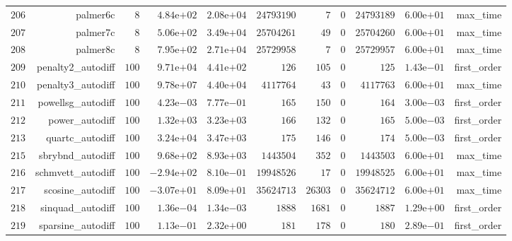 \documentclass[varwidth=20cm,crop=true]{standalone}
\begin{document}
\begin{longtable}{rrrrrrrrrrr}
  \(   206\) & palmer6c & \(     8\) & \( 4.84\)e\(+02\) & \( 2.08\)e\(+04\) & \(24793190\) & \(     7\) & \(     0\) & \(24793189\) & \( 6.00\)e\(+01\) & max\_time \\
  \(   207\) & palmer7c & \(     8\) & \( 5.06\)e\(+02\) & \( 3.49\)e\(+04\) & \(25704261\) & \(    49\) & \(     0\) & \(25704260\) & \( 6.00\)e\(+01\) & max\_time \\
  \(   208\) & palmer8c & \(     8\) & \( 7.95\)e\(+02\) & \( 2.71\)e\(+04\) & \(25729958\) & \(     7\) & \(     0\) & \(25729957\) & \( 6.00\)e\(+01\) & max\_time \\
  \(   209\) & penalty2\_autodiff & \(   100\) & \( 9.71\)e\(+04\) & \( 4.41\)e\(+02\) & \(   126\) & \(   105\) & \(     0\) & \(   125\) & \( 1.43\)e\(-01\) & first\_order \\
  \(   210\) & penalty3\_autodiff & \(   100\) & \( 9.78\)e\(+07\) & \( 4.40\)e\(+04\) & \(4117764\) & \(    43\) & \(     0\) & \(4117763\) & \( 6.00\)e\(+01\) & max\_time \\
  \(   211\) & powellsg\_autodiff & \(   100\) & \( 4.23\)e\(-03\) & \( 7.77\)e\(-01\) & \(   165\) & \(   150\) & \(     0\) & \(   164\) & \( 3.00\)e\(-03\) & first\_order \\
  \(   212\) & power\_autodiff & \(   100\) & \( 1.32\)e\(+03\) & \( 3.23\)e\(+03\) & \(   166\) & \(   132\) & \(     0\) & \(   165\) & \( 5.00\)e\(-03\) & first\_order \\
  \(   213\) & quartc\_autodiff & \(   100\) & \( 3.24\)e\(+04\) & \( 3.47\)e\(+03\) & \(   175\) & \(   146\) & \(     0\) & \(   174\) & \( 5.00\)e\(-03\) & first\_order \\
  \(   215\) & sbrybnd\_autodiff & \(   100\) & \( 9.68\)e\(+02\) & \( 8.93\)e\(+03\) & \(1443504\) & \(   352\) & \(     0\) & \(1443503\) & \( 6.00\)e\(+01\) & max\_time \\
  \(   216\) & schmvett\_autodiff & \(   100\) & \(-2.94\)e\(+02\) & \( 8.10\)e\(-01\) & \(19948526\) & \(    17\) & \(     0\) & \(19948525\) & \( 6.00\)e\(+01\) & max\_time \\
  \(   217\) & scosine\_autodiff & \(   100\) & \(-3.07\)e\(+01\) & \( 8.09\)e\(+01\) & \(35624713\) & \( 26303\) & \(     0\) & \(35624712\) & \( 6.00\)e\(+01\) & max\_time \\
  \(   218\) & sinquad\_autodiff & \(   100\) & \( 1.36\)e\(-04\) & \( 1.34\)e\(-03\) & \(  1888\) & \(  1681\) & \(     0\) & \(  1887\) & \( 1.29\)e\(+00\) & first\_order \\
  \(   219\) & sparsine\_autodiff & \(   100\) & \( 1.13\)e\(-01\) & \( 2.32\)e\(+00\) & \(   181\) & \(   178\) & \(     0\) & \(   180\) & \( 2.89\)e\(-01\) & first\_order \\

\end{longtable}
\end{document}

